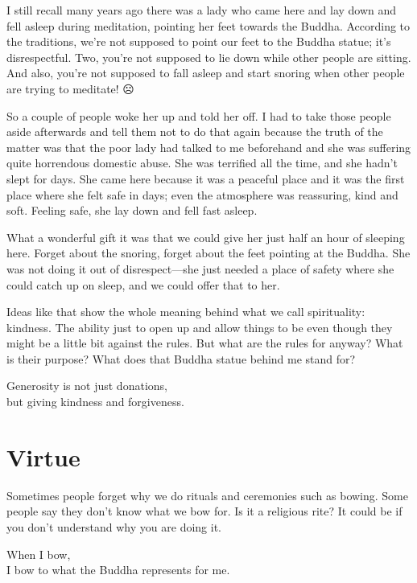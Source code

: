 \documentclass[12pt, openany]{book}
\newenvironment{aphorism}%
{%
\begin{center}\begin{itshape}
}%
{\end{itshape}\end{center}
}%
\begin{document}
I still recall many years ago there was a lady who came here and lay down and fell asleep during meditation, pointing her feet towards the Buddha. According to the traditions, we’re not supposed to point our feet to the Buddha statue; it’s disrespectful. Two, you’re not supposed to lie down while other people are sitting. And also, you’re not supposed to fall asleep and start snoring when other people are trying to meditate! ☹

So a couple of people woke her up and told her off. I had to take those people aside afterwards and tell them not to do that again because the truth of the matter was that the poor lady had talked to me beforehand and she was suffering quite horrendous domestic abuse. She was terrified all the time, and she hadn’t slept for days. She came here because it was a peaceful place and it was the first place where she felt safe in days; even the atmosphere was reassuring, kind and soft. Feeling safe, she lay down and fell fast asleep. 

What a wonderful gift it was that we could give her just half an hour of sleeping here. Forget about the snoring, forget about the feet pointing at the Buddha. She was not doing it out of disrespect—she just needed a place of safety where she could catch up on sleep, and we could offer that to her. 

Ideas like that show the whole meaning behind what we call spirituality: kindness. The ability just to open up and allow things to be even though they might be a little bit against the rules. But what are the rules for anyway? What is their purpose? What does that Buddha statue behind me stand for? 

\begin{aphorism}
Generosity is not just donations,\\  
but giving kindness and forgiveness.
\end{aphorism}

\section*{Virtue}

Sometimes people forget why we do rituals and ceremonies such as bowing. Some people say they don’t know what we bow for. Is it a religious rite? It could be if you don’t understand why you are doing it. 

\begin{aphorism}
When I bow,\\  
I bow to what the Buddha represents for me.
\end{aphorism}
\end{document}
